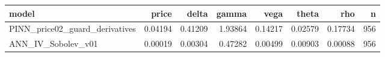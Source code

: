 \begin{tabular}{lrrrrrrr}
\toprule
model & price & delta & gamma & vega & theta & rho & n \\
\midrule
PINN_price02_guard_derivatives & 0.04194 & 0.41209 & 1.93864 & 0.14217 & 0.02579 & 0.17734 & 956 \\
ANN_IV_Sobolev_v01 & 0.00019 & 0.00304 & 0.47282 & 0.00499 & 0.00903 & 0.00088 & 956 \\
\bottomrule
\end{tabular}
